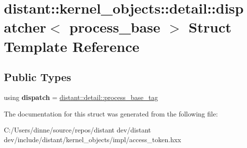 \hypertarget{structdistant_1_1kernel__objects_1_1detail_1_1dispatcher_3_01process__base_01_4}{}\section{distant\+:\+:kernel\+\_\+objects\+:\+:detail\+:\+:dispatcher$<$ process\+\_\+base $>$ Struct Template Reference}
\label{structdistant_1_1kernel__objects_1_1detail_1_1dispatcher_3_01process__base_01_4}
\subsection*{Public Types}
\begin{DoxyCompactItemize}
\item 
\mbox{\label{structdistant_1_1kernel__objects_1_1detail_1_1dispatcher_3_01process__base_01_4_a8720cc8d4df1f497c3b4c17c109af8c0}} 
using {\bfseries dispatch} = \mbox{\hyperlink{classdistant_1_1detail_1_1process__base__tag}{distant\+::detail\+::process\+\_\+base\+\_\+tag}}
\end{DoxyCompactItemize}


The documentation for this struct was generated from the following file\+:\begin{DoxyCompactItemize}
\item 
C\+:/\+Users/dinne/source/repos/distant dev/distant dev/include/distant/kernel\+\_\+objects/impl/access\+\_\+token.\+hxx\end{DoxyCompactItemize}
